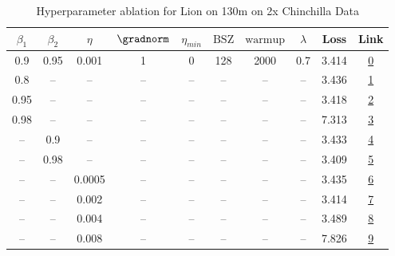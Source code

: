 \begin{table}[H]
\centering
\caption{Hyperparameter ablation for Lion on 130m on 2x Chinchilla Data}
\label{tab:ablation_lion_130m_on_2x_chinchilla_data}
\begin{tabular}{cccccccccc}
\toprule
$\beta_1$ & $\beta_2$ & $\eta$ & $\gradnorm$ & $\eta_{min}$ & $\mathrm{BSZ}$ & $\mathrm{warmup}$ & $\lambda$ & Loss & Link \\
\midrule
0.9 & 0.95 & 0.001 & 1 & 0 & 128 & 2000 & 0.7 & 3.414 & \href{https://wandb.ai/stanford-mercury/optimizer-scaling/runs/sweep-130m-5B-lione0352dlr0.001-wd0.7-minlr0-warmup2000-b10.9-b2-89e6a1}{0} \\
\midrule
0.8 & -- & -- & -- & -- & -- & -- & -- & 3.436 & \href{https://wandb.ai/stanford-mercury/optimizer-scaling/runs/sweep-130m-5B-lion50b543lr0.001-wd0.7-minlr0-warmup2000-b10.8-b2-b6925d}{1} \\
0.95 & -- & -- & -- & -- & -- & -- & -- & 3.418 & \href{https://wandb.ai/stanford-mercury/optimizer-scaling/runs/sweep-130m-5B-liondeda64lr0.001-wd0.7-minlr0-warmup2000-b10.95-b-005903}{2} \\
0.98 & -- & -- & -- & -- & -- & -- & -- & 7.313 & \href{https://wandb.ai/stanford-mercury/optimizer-scaling/runs/sweep-130m-5B-lion2ccccblr0.001-wd0.7-minlr0-warmup2000-b10.98-b-ce81dd}{3} \\
-- & 0.9 & -- & -- & -- & -- & -- & -- & 3.433 & \href{https://wandb.ai/stanford-mercury/optimizer-scaling/runs/sweep-130m-5B-lion9321cblr0.001-wd0.7-minlr0-warmup2000-b10.9-b2-f29f78}{4} \\
-- & 0.98 & -- & -- & -- & -- & -- & -- & 3.409 & \href{https://wandb.ai/stanford-mercury/optimizer-scaling/runs/sweep-130m-5B-lion5d07e9lr0.001-wd0.7-minlr0-warmup2000-b10.9-b2-6d65d0}{5} \\
-- & -- & 0.0005 & -- & -- & -- & -- & -- & 3.435 & \href{https://wandb.ai/stanford-mercury/optimizer-scaling/runs/sweep-130m-5B-lionb0bcd6lr0.0005-wd0.7-minlr0-warmup2000-b10.9-b-409f2d}{6} \\
-- & -- & 0.002 & -- & -- & -- & -- & -- & 3.414 & \href{https://wandb.ai/stanford-mercury/optimizer-scaling/runs/sweep-130m-5B-lion806a2blr0.002-wd0.7-minlr0-warmup2000-b10.9-b2-4fa558}{7} \\
-- & -- & 0.004 & -- & -- & -- & -- & -- & 3.489 & \href{https://wandb.ai/stanford-mercury/optimizer-scaling/runs/sweep-130m-5B-lion183c87lr0.004-wd0.7-minlr0-warmup2000-b10.9-b2-3f102b}{8} \\
-- & -- & 0.008 & -- & -- & -- & -- & -- & 7.826 & \href{https://wandb.ai/stanford-mercury/optimizer-scaling/runs/sweep-130m-5B-lion99fb2blr0.008-wd0.7-minlr0-warmup2000-b10.9-b2-4c4fe7}{9} \\

\end{tabular}
\end{table}
